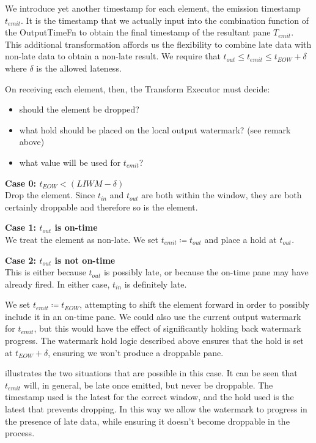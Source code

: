 We introduce yet another timestamp for each element, the emission timestamp $t_{\mathit{emit}}$.
It is the timestamp that we actually input into the combination function of the OutputTimeFn to obtain the final timestamp of the resultant pane $T_{\mathit{emit}}$.
This additional transformation affords us the flexibility to combine late data with non-late data to obtain a non-late result.
We require that $t_{\mathit{out}} \leq t_{\mathit{emit}} \leq t_{\mathit{EOW}} + \delta$ where $\delta$ is the allowed lateness.

On receiving each element, then, the Transform Executor must decide:
\begin{itemize}
	\item should the element be dropped?
	\item what hold should be placed on the local output watermark? (see remark above)
	\item what value will be used for $t_{\mathit{emit}}$?
\end{itemize}


\textbf{Case 0: $t_{\mathit{EOW}} < (\mathit{LIWM} - \delta)$}\\
Drop the element.
Since $t_{\mathit{in}}$ and $t_{\mathit{out}}$ are both within the window, they are both certainly droppable and therefore so is the element.

\textbf{Case 1: $t_{\mathit{out}}$ is on-time}\\
We treat the element as non-late.
We set $t_{\mathit{emit}} \coloneq t_{\mathit{out}}$ and place a hold at $t_{\mathit{out}}$.

\textbf{Case 2: $t_{\mathit{out}}$ is not on-time}\\
This is either because $t_{\mathit{out}}$ is possibly late, or because the on-time pane may have already fired.
In either case, $t_{\mathit{in}}$ is definitely late.

We set $t_{\mathit{emit}} \coloneq t_{\mathit{EOW}}$, attempting to shift the element forward in order to possibly include it in an on-time pane.
We could also use the current output watermark for $t_{\mathit{emit}}$, but this would have the effect of significantly holding back watermark progress.
The watermark hold logic described above ensures that the hold is set at $t_{\mathit{EOW}} + \delta$, ensuring we won't produce a droppable pane.


 illustrates the two situations that are possible in this case. It can be seen that $t_{\mathit{emit}}$ will, in general, be late once emitted, but never be droppable. 
The timestamp used is the latest for the correct window, and the hold used is the latest that prevents dropping.
In this way we allow the watermark to progress in the presence of late data, while ensuring it doesn't become droppable in the process.

